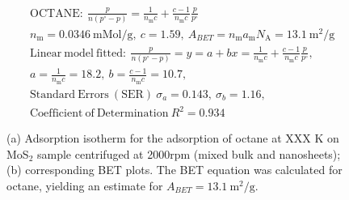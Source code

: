 

\begin{align*}
&\mathrm{OCTANE:}\ \frac{p}{n(p^\circ-p)}=\frac{1}{n_\mathrm{m}c}+\frac{c-1}{n_\mathrm{m}c}\frac{p}{p^\circ}\\
&{n_\mathrm{m}}=0.0346\ \mathrm{mMol/g},\ c=1.59,\ A_{BET}={n_\mathrm{m}}{a_\mathrm{m}}{N_\mathrm{A}}=13.1\ \mathrm{m}^2\mathrm{/g}\\
&\mathrm{Linear\ model\ fitted:}\ \frac{p}{n(p^\circ-p)}=y=a+bx=\frac{1}{n_\mathrm{m}c}+\frac{c-1}{n_\mathrm{m}c}\frac{p}{p^\circ},\\
&a=\frac{1}{n_\mathrm{m}c}=18.2,\ b=\frac{c-1}{n_\mathrm{m}c}=10.7,\\
&\mathrm{Standard\ Errors\ (SER)}\ \sigma_a=0.143,\ \sigma_b=1.16,\\
&\mathrm{Coefficient\ of\ Determination}\ R^2 = 0.934
\end{align*}


\begin{figure}[htb]
\hfill
{}
\caption{(a) Adsorption isotherm for the adsorption of octane at XXX K on MoS$_2$ 
sample centrifuged at 2000rpm (mixed bulk and nanosheets);
(b) corresponding BET plots. The BET equation was calculated for octane, yielding an estimate for $A_{BET}=13.1\ \mathrm{m}^2\mathrm{/g}$.}

\label{fig:sa-Reference-As-Supplied-5mg-3mm-30C-S2-SA-10ml}
\end{figure}


